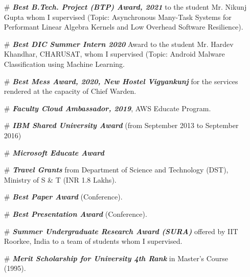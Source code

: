 \begin{itemize}
	\item[\#]
    \emph{\textbf{Best B.Tech. Project (BTP) Award, 2021}} to the student Mr. Nikunj Gupta whom I supervised (Topic: Asynchronous Many-Task Systems for Performant Linear Algebra Kernels and Low Overhead Software Resilience). 

	\item[\#]
    \emph{\textbf{Best DIC Summer Intern 2020}} Award to the student Mr. Hardev Khandhar, CHARUSAT,  whom I supervised (Topic: Android Malware Classification using Machine Learning.
	
	\item[\#]
    \emph{\textbf{Best Mess Award, 2020, New Hostel Vigyankunj}} for the services rendered at the capacity of Chief Warden.
	
	\item[\#]
	\emph{\textbf{Faculty Cloud Ambassador, 2019}}, AWS Educate Program.

	\item[\#]
	\textbf{\textit{IBM Shared University Award}} (from September 2013 to September 2016)
	
		\item[\#]
	\textbf{\textit{Microsoft Educate Award}}
	
	\item[\#]
	\emph{\textbf{Travel Grants}} from Department of Science and Technology (DST), Ministry of S \& T
	(INR 1.8 Lakhs).
	
	\item[\#]
	\emph{\textbf{Best Paper Award}} (Conference).
	
	\item[\#]
	\emph{\textbf{Best Presentation Award}} (Conference).
	
	\item[\#]
	\textbf{\textit{Summer Undergraduate Research Award (SURA)}} offered by IIT Roorkee, India to a team of students whom I supervised.
	
	\item[\#]
	\emph{\textbf{Merit Scholarship for University 4th Rank}} in Master's Course (1995).
	
\end{itemize}
	
